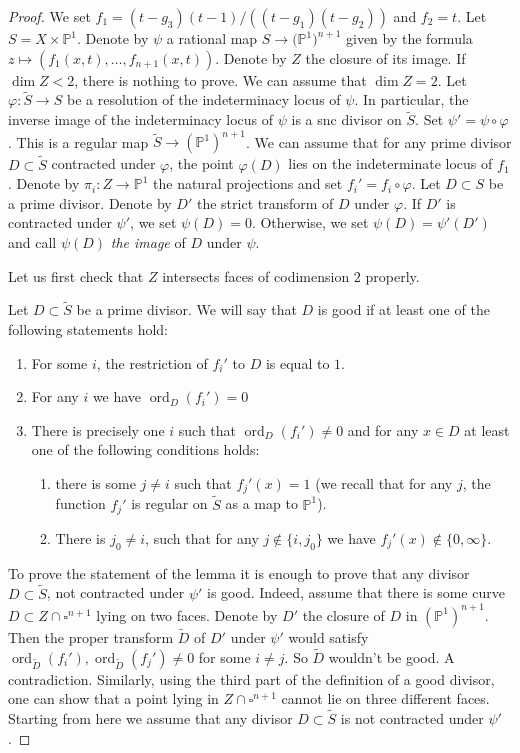 \documentclass[12pt]{extarticle}
\def\mb{\mathbb}
\def\ph{\varphi}
\def\t{\times}
\def\wt{\widetilde}
\renewcommand{\P}{{\mb P}}
\DeclareMathOperator{\ord}{ord}
\begin{document}
\begin{proof}
We set $f_1=(t-g_3)(t-1)/((t-g_1)(t-g_2))$ and $f_2=t$. Let $S=X\t\P^1$. Denote by $\psi$ a rational map $S\to\mb (\P^1)^{n+1}$ given by the formula $z\mapsto (f_1(x,t),\dots, f_{n+1}(x,t))$. Denote by $Z$ the closure of its image. If $\dim Z<2$, there is nothing to prove. We can assume that $\dim Z=2$. Let $\ph\colon \wt S\to S$ be a resolution of the indeterminacy locus of $\psi$. In particular, the inverse image of the indeterminacy locus of $\psi$ is a snc divisor on $\wt S$. Set $\psi'=\psi\circ\varphi$. This is a regular map $\wt S\to (\P^1)^{n+1}$. We can assume that for any prime divisor $D\subset \wt S$ contracted under $\ph$, the point $\ph(D)$ lies on the indeterminate locus of $f_1$. Denote by $\pi_i\colon Z\to \P^1$ the natural projections and set $f_i'=f_i\circ \ph$. Let $D\subset S$ be a prime divisor. Denote by $D'$ the strict transform of $D$ under $\ph$. If $D'$ is contracted under $\psi'$, we set $\psi(D)=0$. Otherwise, we set $\psi(D)=\psi'(D')$ and call $\psi(D)$ \emph{the image} of $D$ under $\psi$.

Let us first check that $Z$ intersects faces of codimension $2$ properly.



Let $D\subset \wt S$ be a prime divisor.  We will say that $D$ is good if at least one of the following statements hold:
\begin{enumerate}
    \item For some $i$, the restriction of $f_i'$ to $D$ is equal to $1$.
   \item For any $i$ we have $\ord_{D}(f_i')=0$
    \item There is precisely one $i$ such that $\ord_D(f_i')\ne 0$ and for any $x\in D$ at least one of the following conditions holds:
    \begin{enumerate}
       \item there is some $j\ne i$ such that  $f_j'(x)=1$ (we recall that for any $j$, the function $f_j'$ is regular on $\wt S$ as a map to $\P^1$).
        \item There is $j_0\ne i$, such that for any $j\not\in\{i,j_0\}$ we have $f_j'(x)\not\in\{0,\infty\}$.
    \end{enumerate}
\end{enumerate}

To prove the statement of the lemma it is enough to prove that any divisor $D\subset\wt S$, not contracted under $\psi'$ is good. Indeed, assume that there is some curve $D\subset Z\cap\square^{n+1}$ lying on two faces. Denote by $D'$ the closure of $D$ in $(\P^1)^{n+1}$. Then the proper transform $\wt D$ of $D'$ under $\psi'$ would satisfy $\ord_{\wt D}(f_i'),\ord_{\wt D}(f_j')\ne 0$ for some $i\ne j$. So $\wt D$ wouldn't be good. A contradiction. Similarly, using the third part of the definition of a good divisor, one can show that a point lying in $Z\cap\square^{n+1}$ cannot lie on three different faces. Starting from here we assume that any divisor $D\subset \wt S$ is not contracted under $\psi'$.


\end{proof}
\end{document}
